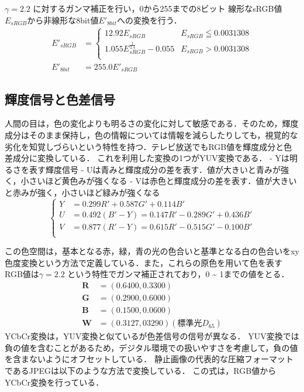 \documentclass[
]{article}
\begin{document}
\(\gamma = 2.2\) に対するガンマ補正を行い，0から255までの8ビット
線形なsRGB値 \(E_{sRGB}\)から非線形な8bit値\(E'_{8bit}\)への変換を行う．
\begin{equation}
\begin{aligned}
E'_{sRGB} &=
\begin{cases}
12.92 E_{sRGB} & E_{sRGB} \leqq 0.0031308 \\
1.055 E_{sRGB}^{\frac{1}{2.4}} - 0.055 & E_{sRGB} > 0.0031308 \\
\end{cases} \\
E'_{8bit} &=255.0E'_{sRGB}
\end{aligned}
\end{equation}
\subsection{輝度信号と色差信号}
人間の目は，色の変化よりも明るさの変化に対して敏感である．そのため，輝度成分はそのまま保持し，色の情報については情報を減らしたりしても，視覚的な劣化を知覚しづらいという特性を持つ．テレビ放送でもRGB値を輝度成分と色差成分に変換している．
これを利用した変換の1つがYUV変換である． - Yは明るさを表す輝度信号 -
Uは青みと輝度成分の差を表す．値が大きいと青みが強く，小さいほど黄色みが強くなる
-
Vは赤色と輝度成分の差を表す．値が大きいと赤みが強く，小さいほど緑みが強くなる
\begin{equation}
\begin{cases}
Y &= 0.299R' + 0.587G' + 0.114B' \\
U &= 0.492(B' - Y) = 0.147R' - 0.289G' + 0.436B' \\
V &= 0.877(R' - Y) = 0.615R' - 0.515G' - 0.100B' \\
\end{cases}
\end{equation}

この色空間は，基本となる赤，緑，青の光の色合いと基準となる白の色合いをxy色度変換という方法で定義している．また，これらの原色を用いて色を表すRGB値は\(\gamma = 2.2\)
という特性でガンマ補正されており，0 \textasciitilde{} 1までの値をとる．
\begin{equation}
\begin{aligned}
    \textbf{R} &= (0.6400, 0.3300) \\
    \textbf{G} &= (0.2900, 0.6000) \\
    \textbf{B} &= (0.1500, 0.0600) \\
    \textbf{W} &= (0.3127, 03290) (\text{標準光}D_{65})
\end{aligned}
\end{equation}
YCbCr変換は，YUV変換と似ているが色差信号の信号が異なる．
YUV変換では負の値を含むことがあるため，デジタル環境での扱いやすさを考慮して，負の値を含まないようにオフセットしている．
静止画像の代表的な圧縮フォーマットであるJPEGは以下のような方法で変換している．
この式は，RGB値からYCbCr変換を行っている．
\end{document}
